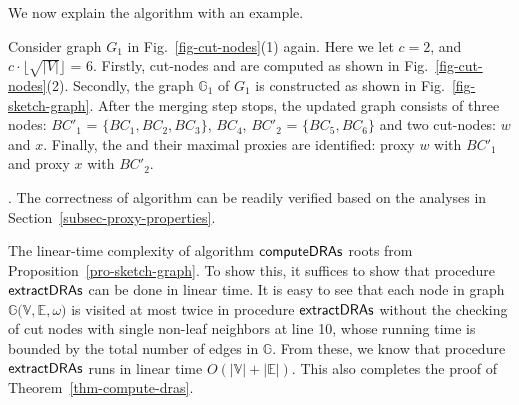 We now explain the algorithm with an example.

\vspace{-0.5ex}
\begin{example}
\label{exm-compute-proxies} Consider graph $G_1$ in Fig.~\ref{fig-cut-nodes}(1) again. Here we let $c = 2$, and $c\cdot\lfloor\sqrt{|V|}\rfloor$ = $6$.
Firstly, cut-nodes and \bccs are computed as shown in Fig.~\ref{fig-cut-nodes}(2).
Secondly, the \bcsketch graph $\mathbb{G}_1$ of $G_1$ is constructed as shown in Fig.~\ref{fig-sketch-graph}.
After the merging step stops, the updated \bcsketch graph consists of three \bc nodes:
$BC'_1$ = $\{BC_1, BC_2, BC_3\}$, $BC_4$, $BC'_2$ = $\{BC_5, BC_6\}$ and two cut-nodes: $w$ and $x$.
Finally, the \dras and their maximal proxies are identified: proxy $w$ with \dra $BC'_1$ and proxy $x$ with  \dra $BC'_2$.
\end{example}
\vspace{-0.5ex}

\vspace{-1ex}
. The correctness of algorithm \compDRAs can be readily verified based on the analyses in Section~\ref{subsec-proxy-properties}.

The linear-time complexity of algorithm ${\mathsf{computeDRAs}}$ roots from Proposition~\ref{pro-sketch-graph}.
To show this, it suffices to show that procedure ${\mathsf{extractDRAs}}$ can be done in linear time.
It is easy to see that each node in \bcsketch graph $\mathbb{G(V, E}, \omega)$ is visited at most twice in procedure ${\mathsf{extractDRAs}}$ without the checking of cut nodes with single non-leaf neighbors at line 10, whose running time is bounded by the total number of edges in $\mathbb{G}$.
From these, we know that procedure ${\mathsf{extractDRAs}}$ runs in linear time $O(|\mathbb{V}|+|\mathbb{E}|)$.
%
This also completes the proof of Theorem~\ref{thm-compute-dras}.



